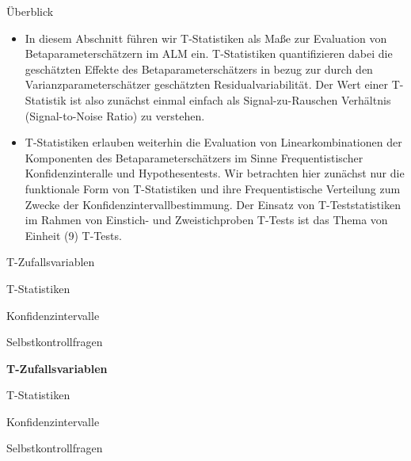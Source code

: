 \documentclass[
  8pt,
  ignorenonframetext,
]{beamer}
\begin{document}
\begin{frame}{}
\protect\hypertarget{section-7}{}
Überblick

\small

\begin{itemize}
\item
  \justifying In diesem Abschnitt führen wir T-Statistiken als Maße zur
  Evaluation von Betaparameterschätzern im ALM ein. T-Statistiken
  quantifizieren dabei die geschätzten Effekte des
  Betaparameterschätzers in bezug zur durch den Varianzparameterschätzer
  geschätzten Residualvariabilität. Der Wert einer T-Statistik ist also
  zunächst einmal einfach als Signal-zu-Rauschen Verhältnis
  (Signal-to-Noise Ratio) zu verstehen.
\item
  \justifying T-Statistiken erlauben weiterhin die Evaluation von
  Linearkombinationen der Komponenten des Betaparameterschätzers im
  Sinne Frequentistischer Konfidenzinteralle und Hypothesentests. Wir
  betrachten hier zunächst nur die funktionale Form von T-Statistiken
  und ihre Frequentistische Verteilung zum Zwecke der
  Konfidenzintervallbestimmung. Der Einsatz von T-Teststatistiken im
  Rahmen von Einstich- und Zweistichproben T-Tests ist das Thema von
  Einheit (9) T-Tests.
\end{itemize}
\end{frame}

\begin{frame}{}
\protect\hypertarget{section-8}{}
\vfill
\large
{}

T-Zufallsvariablen

T-Statistiken

Konfidenzintervalle

Selbstkontrollfragen \vfill
\end{frame}

\begin{frame}{}
\protect\hypertarget{section-9}{}
\vfill
\large
{}

\textbf{T-Zufallsvariablen}

T-Statistiken

Konfidenzintervalle

Selbstkontrollfragen \vfill
\end{frame}
\end{document}
